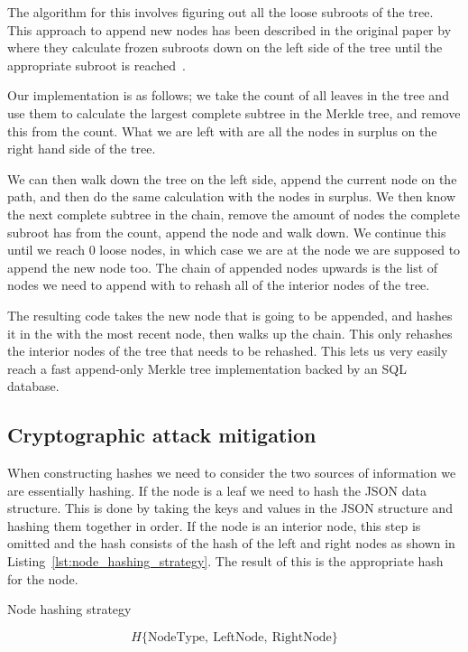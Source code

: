 \documentclass[../Main/thesis.tex]{subfiles}
\begin{document}
The algorithm for this involves figuring out all the loose subroots of the tree.
This approach to append new nodes has been described in the original paper
by~\citeauthor{182788} where they calculate frozen subroots down on the left
side of the tree until the appropriate subroot is reached~\cite{182788}.

Our implementation is as follows; we take the count of all leaves in the tree and
use them to calculate the largest complete subtree in the Merkle tree, and
remove this from the count.  What we are left with are all the nodes in surplus
on the right hand side of the tree.

We can then walk down the tree on the left side, append the current node on the
path, and then do the same calculation with the nodes in surplus. We then know
the next complete subtree in the chain, remove the amount of nodes the complete
subroot has from the count, append the node and walk down. We continue this
until we reach 0 loose nodes, in which case we are at the node we are supposed to
append the new node too. The chain of appended nodes upwards is the list of
nodes we need to append with to rehash all of the interior nodes of the tree.

The resulting code takes the new node that is going to be appended, and hashes
it in the with the most recent node, then walks up the chain. This only rehashes
the interior nodes of the tree that needs to be rehashed. This lets us very
easily reach a fast append-only Merkle tree implementation backed by an SQL
database.


\subsection*{Cryptographic attack mitigation}%
\label{sub:mitigate_attack}
When constructing hashes we need to consider the two sources of information we
are essentially hashing. If the node is a leaf we need to hash the JSON data
structure. This is done by taking the keys and values in the JSON structure and
hashing them together in order. If the node is an interior node, this step is
omitted and the hash consists of the hash of the left and right nodes as shown
in Listing~\ref{lst:node_hashing_strategy}. The result of this is the
appropriate hash for the node.

\begin{listing}[H]
\caption{Node hashing strategy}
\label{lst:node_hashing_strategy}
\begin{equation*}
H\{\text{NodeType},\ \text{LeftNode},\ \text{RightNode}\}
\end{equation*}
\end{listing}
\end{document}
